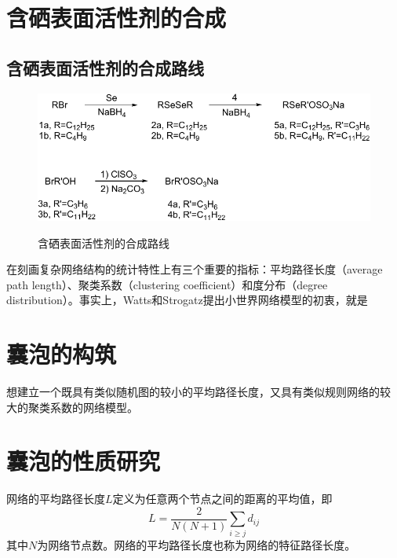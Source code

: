 \documentclass[bachelor,adobefonts]{jnuthesis} %
\begin{document}
    \section{含硒表面活性剂的合成}
    \subsection{含硒表面活性剂的合成路线}
    \begin{figure}[htbp]
        \centering
        \includegraphics[]{Figure/synthesis.pdf}\\
        \caption{含硒表面活性剂的合成路线}\label{fig:synthesis}
    \end{figure}
    
    在刻画复杂网络结构的统计特性上有三个重要的指标：平均路径长度（average
    path length）、聚类系数（clustering coefficient）和度分布（degree
    distribution）。事实上，Watts和Strogatz提出小世界网络模型的初衷，就是
    
    \section{囊泡的构筑}
    
    想建立一个既具有类似随机图的较小的平均路径长度，又具有类似规则网络的较
    大的聚类系数的网络模型。
    
    \section{囊泡的性质研究}
    
    \begin{definition}[平均路径长度]
        网络的平均路径长度$L$定义为任意两个节点之间的距离的平均值，即
        \begin{equation}\label{eq:avarage_path_lentgh}
        L = \frac{2}{N(N+1)}\sum_{i\geq j}d_{ij}
        \end{equation}
        其中$N$为网络节点数。网络的平均路径长度也称为网络的特征路径长度。
    \end{definition}
    
\end{document}
